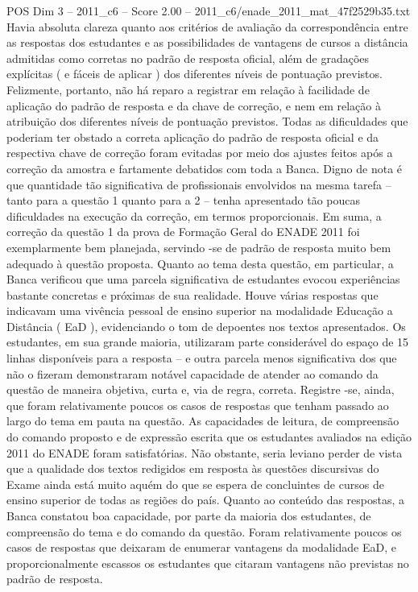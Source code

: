 \begin{textsample}{POS Dim 3 – 2011\_c6 – Score 2.00 – 2011\_c6/enade\_2011\_mat\_47f2529b35.txt}
Havia absoluta clareza quanto aos critérios de avaliação da correspondência entre as respostas dos estudantes e as possibilidades de vantagens de cursos a distância admitidas como corretas no padrão de resposta oficial, além de gradações explícitas ( e fáceis de aplicar ) dos diferentes níveis de pontuação previstos.
Felizmente, portanto, não há reparo a registrar em relação à facilidade de aplicação do padrão de resposta e da chave de correção, e nem em relação à atribuição dos diferentes níveis de pontuação previstos.
Todas as dificuldades que poderiam ter obstado a correta aplicação do padrão de resposta oficial e da respectiva chave de correção foram evitadas por meio dos ajustes feitos após a correção da amostra e fartamente debatidos com toda a Banca.
Digno de nota é que quantidade tão significativa de profissionais envolvidos na mesma tarefa – tanto para a questão 1 quanto para a 2 – tenha apresentado tão poucas dificuldades na execução da correção, em termos proporcionais.
Em suma, a correção da questão 1 da prova de Formação Geral do ENADE 2011 foi exemplarmente bem planejada, servindo -se de padrão de resposta muito bem adequado à questão proposta.
Quanto ao tema desta questão, em particular, a Banca verificou que uma parcela significativa de estudantes evocou experiências bastante concretas e próximas de sua realidade.
Houve várias respostas que indicavam uma vivência pessoal de ensino superior na modalidade Educação a Distância ( EaD ), evidenciando o tom de depoentes nos textos apresentados.
Os estudantes, em sua grande maioria, utilizaram parte considerável do espaço de 15 linhas disponíveis para a resposta – e outra parcela menos significativa dos que não o fizeram demonstraram notável capacidade de atender ao comando da questão de maneira objetiva, curta e, via de regra, correta.
Registre -se, ainda, que foram relativamente poucos os casos de respostas que tenham passado ao largo do tema em pauta na questão.
As capacidades de leitura, de compreensão do comando proposto e de expressão escrita que os estudantes avaliados na edição 2011 do ENADE foram satisfatórias.
Não obstante, seria leviano perder de vista que a qualidade dos textos redigidos em resposta às questões discursivas do Exame ainda está muito aquém do que se espera de concluintes de cursos de ensino superior de todas as regiões do país.
Quanto ao conteúdo das respostas, a Banca constatou boa capacidade, por parte da maioria dos estudantes, de compreensão do tema e do comando da questão.
Foram relativamente poucos os casos de respostas que deixaram de enumerar vantagens da modalidade EaD, e proporcionalmente escassos os estudantes que citaram vantagens não previstas no padrão de resposta.

\end{textsample}
